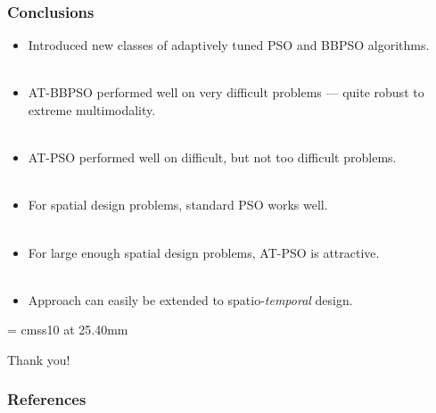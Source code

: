 \documentclass[xcolor=dvipsnames]{beamer}
\begin{document}
\begin{frame}
  \frametitle{Conclusions}
  \begin{itemize}
  \item Introduced new classes of adaptively tuned PSO and BBPSO algorithms.\\~\\ \pause
  \item AT-BBPSO performed well on very difficult problems --- quite robust to extreme multimodality. \\~\\ \pause
  \item AT-PSO performed well on difficult, but not too difficult problems. \\~\\ \pause
  \item For spatial design problems, standard PSO works well. \\~\\\pause
  \item For large enough spatial design problems, AT-PSO is attractive. \\~\\\pause
  \item Approach can easily be extended to spatio-\emph{temporal} design.
  \end{itemize}
\end{frame}

\appendix
{}
\setcounter{finalframe}{\value{framenumber}}

\begin{frame}

      \begin{center}

        \font\endfont = cmss10 at 25.40mm
        \color{MUgold}
        \endfont
        \baselineskip 20.0mm

        Thank you!

      \end{center}


\end{frame}

\begin{frame}[allowframebreaks]
        \frametitle{References}
        
        
\end{frame}
\setcounter{framenumber}{\value{finalframe}}
\end{document}
